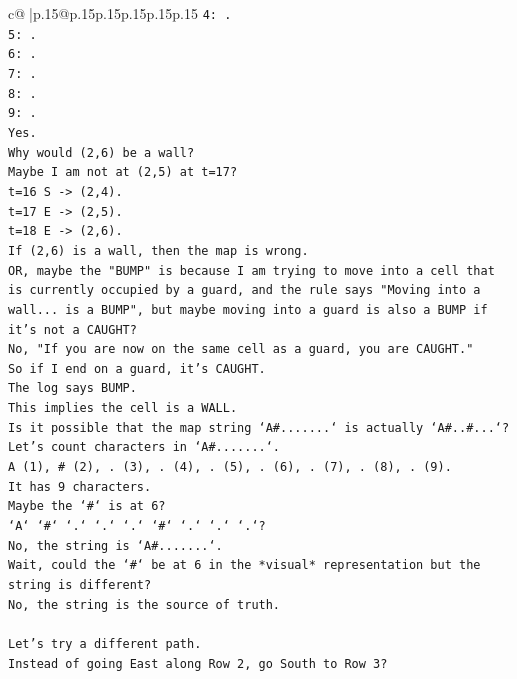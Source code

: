 \documentclass{article}
\begin{document}
{\begin{supertabular}{c@{$\;$}|p{.15\linewidth}@{}p{.15\linewidth}p{.15\linewidth}p{.15\linewidth}p{.15\linewidth}p{.15\linewidth}}
{{{\texttt{4: .} \\
\texttt{5: .} \\
\texttt{6: .} \\
\texttt{7: .} \\
\texttt{8: .} \\
\texttt{9: .} \\
\texttt{Yes.} \\
\texttt{Why would (2,6) be a wall?} \\
\texttt{Maybe I am not at (2,5) at t=17?} \\
\texttt{t=16 S {-}> (2,4).} \\
\texttt{t=17 E {-}> (2,5).} \\
\texttt{t=18 E {-}> (2,6).} \\
\texttt{If (2,6) is a wall, then the map is wrong.} \\
\texttt{OR, maybe the "BUMP" is because I am trying to move into a cell that is currently occupied by a guard, and the rule says "Moving into a wall... is a BUMP", but maybe moving into a guard is also a BUMP if it's not a CAUGHT?} \\
\texttt{No, "If you are now on the same cell as a guard, you are CAUGHT."} \\
\texttt{So if I end on a guard, it's CAUGHT.} \\
\texttt{The log says BUMP.} \\
\texttt{This implies the cell is a WALL.} \\
\texttt{Is it possible that the map string `A\#.......` is actually `A\#..\#...`?} \\
\texttt{Let's count characters in `A\#.......`.} \\
\texttt{A (1), \# (2), . (3), . (4), . (5), . (6), . (7), . (8), . (9).} \\
\texttt{It has 9 characters.} \\
\texttt{Maybe the `\#` is at 6?} \\
\texttt{`A` `\#` `.` `.` `.` `\#` `.` `.` `.`?} \\
\texttt{No, the string is `A\#.......`.} \\
\texttt{Wait, could the `\#` be at 6 in the *visual* representation but the string is different?} \\
\texttt{No, the string is the source of truth.} \\
\\ 
\texttt{Let's try a different path.} \\
\texttt{Instead of going East along Row 2, go South to Row 3?} \\
}}}
\end{supertabular}}
\end{document}
